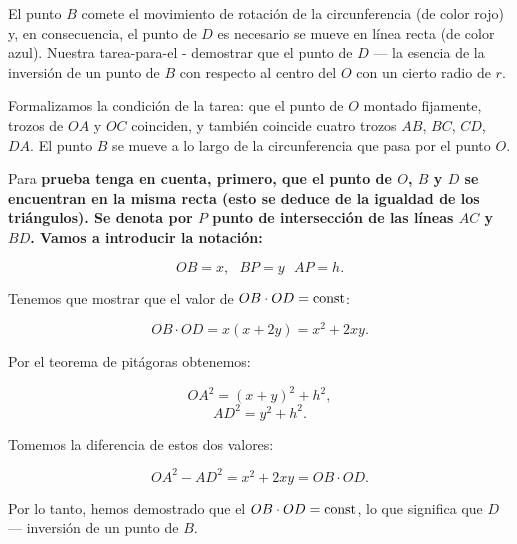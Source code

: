 El punto $B$ comete el movimiento de rotación de la circunferencia (de color rojo) y, en consecuencia, el punto de $D$ es necesario se mueve en línea recta (de color azul). Nuestra tarea-para-el - demostrar que el punto de $D$ --- la esencia de la inversión de un punto de $B$ con respecto al centro del $O$ con un cierto radio de $r$.

Formalizamos la condición de la tarea: que el punto de $O$ montado fijamente, trozos de $OA$ y $OC$ coinciden, y también coincide cuatro trozos $AB$, $BC$, $CD$, $DA$. El punto $B$ se mueve a lo largo de la circunferencia que pasa por el punto $O$.

Para \bf{prueba} tenga en cuenta, primero, que el punto de $O$, $B$ y $D$ se encuentran en la misma recta (esto se deduce de la igualdad de los triángulos). Se denota por $P$ punto de intersección de las líneas $AC$ y $BD$. Vamos a introducir la notación:

$$ OB=x,~~~BP=y~~~AP=h. $$

Tenemos que mostrar que el valor de $OB \cdot OD = {\rm const}$:

$$ OB \cdot OD = x(x+2y) = x^2 + 2xy. $$

Por el teorema de pitágoras obtenemos:

$$ OA^2 = (x+y)^2 + h^2, $$
$$ AD^2 = y^2 + h^2. $$

Tomemos la diferencia de estos dos valores:

$$ OA^2 - AD^2 = x^2 + 2xy = OB \cdot OD. $$

Por lo tanto, hemos demostrado que el $OB \cdot OD = {\rm const}$, lo que significa que $D$ --- inversión de un punto de $B$.

